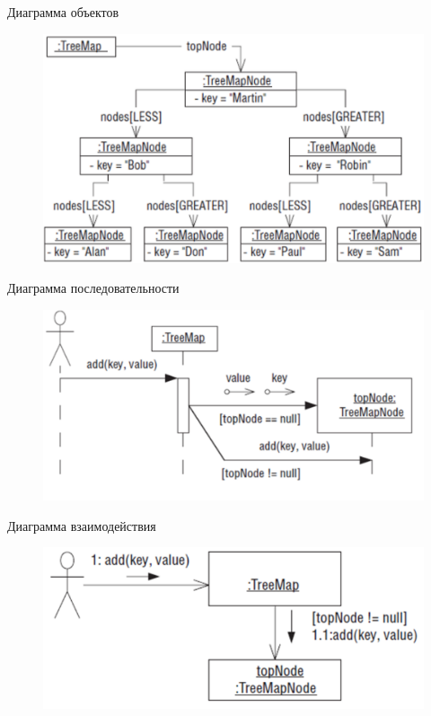 \documentclass{beamer}
\begin{document}
\begin{frame}[t]{Диаграмма объектов}
\begin{figure}[h]
\centering
\includegraphics[scale=0.4]{images/lec03-pic27.png}
\end{figure}
\end{frame}

\begin{frame}[t]{Диаграмма последовательности}
\begin{figure}[h]
\centering
\includegraphics[scale=0.45]{images/lec03-pic28.png}
\end{figure}
\end{frame}

\begin{frame}[t]{Диаграмма взаимодействия}
\begin{figure}[h]
\centering
\includegraphics[scale=0.45]{images/lec03-pic29.png}
\end{figure}
\end{frame}
\end{document}
